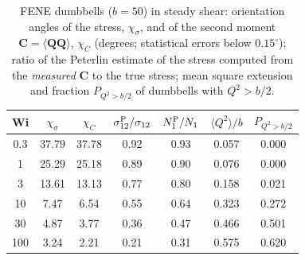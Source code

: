 \begin{table}
\caption{FENE dumbbells ($b=50$) in steady shear: orientation angles of the stress, $\chi_\sigma$, and of the second moment $\bm C=\langle\bm Q\bm Q\rangle$, $\chi_C$ (degrees; statistical errors below $0.15^\circ$); ratio of the Peterlin estimate of the stress computed from the \emph{measured} $\bm C$ to the true stress; mean square extension and fraction $P_{Q^2>b/2}$ of dumbbells with $Q^2>b/2$.}
\begin{ruledtabular}
\begin{tabular}{ccccccc}
Wi & $\chi_\sigma$ & $\chi_C$ & $\sigma_{12}^{\rm P}/\sigma_{12}$ & $N_1^{\rm P}/N_1$ & $\langle Q^2\rangle/b$ & $P_{Q^2>b/2}$\\
\hline
0.3 & 37.79 & 37.78 & 0.92 & 0.93 & 0.057 & 0.000 \\
1 & 25.29 & 25.18 & 0.89 & 0.90 & 0.076 & 0.000 \\
3 & 13.61 & 13.13 & 0.77 & 0.80 & 0.158 & 0.021 \\
10 & 7.47 & 6.54 & 0.55 & 0.64 & 0.323 & 0.272 \\
30 & 4.87 & 3.77 & 0.36 & 0.47 & 0.466 & 0.501 \\
100 & 3.24 & 2.21 & 0.21 & 0.31 & 0.575 & 0.620 \\
\end{tabular}
\end{ruledtabular}
\end{table}
